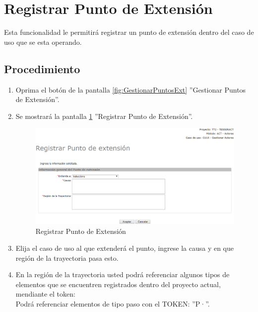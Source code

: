 
\hypertarget{cv:registrarPExt}{\section{Registrar Punto de Extensión}} \label{sec:registrarPExt}

	Esta funcionalidad le permitirá registrar un punto de extensión dentro del caso de uso que se esta operando. 

		\subsection{Procedimiento}

			\begin{enumerate}
	
			\item Oprima el botón \IURegistrar{} de la pantalla \ref{fig:GestionarPuntosExt} ''Gestionar Puntos de Extensión''.
			
			\item Se mostrará la pantalla \ref{fig:registrarPExt} ''Registrar Punto de Extensión''.

			\begin{figure}[H]
				\begin{center}
					\includegraphics[scale=0.5]{roles/lider/puntosExtension/pantallas/IU6-1-4-1registrarPuntosExt}
					\caption{Registrar Punto de Extensión}
					\label{fig:registrarPExt}
				\end{center}
			\end{figure}
		
			\item Elija el caso de uso al que extenderá el punto, ingrese la causa y en que región de la trayectoria pasa esto.
			
			\item En la región de la trayectoria usted podrá referenciar algunos tipos de elementos que se encuentren registrados dentro del proyecto actual, mendiante el token: \\Podrá referenciar elementos de tipo paso con el TOKEN: ''P·''.
			

\end{enumerate}
